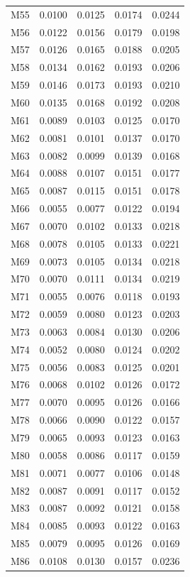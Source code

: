 \begin{longtable}{lrrrr}
M55 & 0.0100 & 0.0125 & 0.0174 & 0.0244 \\
M56 & 0.0122 & 0.0156 & 0.0179 & 0.0198 \\
M57 & 0.0126 & 0.0165 & 0.0188 & 0.0205 \\
M58 & 0.0134 & 0.0162 & 0.0193 & 0.0206 \\
M59 & 0.0146 & 0.0173 & 0.0193 & 0.0210 \\
M60 & 0.0135 & 0.0168 & 0.0192 & 0.0208 \\
M61 & 0.0089 & 0.0103 & 0.0125 & 0.0170 \\
M62 & 0.0081 & 0.0101 & 0.0137 & 0.0170 \\
M63 & 0.0082 & 0.0099 & 0.0139 & 0.0168 \\
M64 & 0.0088 & 0.0107 & 0.0151 & 0.0177 \\
M65 & 0.0087 & 0.0115 & 0.0151 & 0.0178 \\
M66 & 0.0055 & 0.0077 & 0.0122 & 0.0194 \\
M67 & 0.0070 & 0.0102 & 0.0133 & 0.0218 \\
M68 & 0.0078 & 0.0105 & 0.0133 & 0.0221 \\
M69 & 0.0073 & 0.0105 & 0.0134 & 0.0218 \\
M70 & 0.0070 & 0.0111 & 0.0134 & 0.0219 \\
M71 & 0.0055 & 0.0076 & 0.0118 & 0.0193 \\
M72 & 0.0059 & 0.0080 & 0.0123 & 0.0203 \\
M73 & 0.0063 & 0.0084 & 0.0130 & 0.0206 \\
M74 & 0.0052 & 0.0080 & 0.0124 & 0.0202 \\
M75 & 0.0056 & 0.0083 & 0.0125 & 0.0201 \\
M76 & 0.0068 & 0.0102 & 0.0126 & 0.0172 \\
M77 & 0.0070 & 0.0095 & 0.0126 & 0.0166 \\
M78 & 0.0066 & 0.0090 & 0.0122 & 0.0157 \\
M79 & 0.0065 & 0.0093 & 0.0123 & 0.0163 \\
M80 & 0.0058 & 0.0086 & 0.0117 & 0.0159 \\
M81 & 0.0071 & 0.0077 & 0.0106 & 0.0148 \\
M82 & 0.0087 & 0.0091 & 0.0117 & 0.0152 \\
M83 & 0.0087 & 0.0092 & 0.0121 & 0.0158 \\
M84 & 0.0085 & 0.0093 & 0.0122 & 0.0163 \\
M85 & 0.0079 & 0.0095 & 0.0126 & 0.0169 \\
M86 & 0.0108 & 0.0130 & 0.0157 & 0.0236 \\

\end{longtable}
